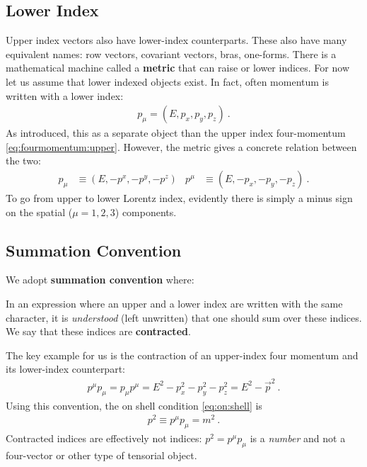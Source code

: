 \documentclass[12pt, oneside]{report}    %
\begin{document}
\subsection{Lower Index}\label{sec:index:lower}

Upper index vectors also have lower-index counterparts. These also have many equivalent names: row vectors, covariant vectors, bras, one-forms. There is a mathematical machine called a \textbf{metric} that can raise or lower indices. For now let us assume that lower indexed objects exist. In fact, often momentum is written with a lower index:
\begin{align}
    p_\mu = (E, p_x, p_y, p_z) \ . 
    \label{eq:fourmomentum:lower}
\end{align}
As introduced, this as a separate object than the upper index four-momentum \eqref{eq:fourmomentum:upper}. However, the metric gives a concrete relation between the two:
\begin{align}
    p_\mu &\equiv (E, -p^x, -p^y, -p^z)
    &
    p^\mu &\equiv (E, -p_x, -p_y, -p_z) \ .
\end{align}
To go from upper to lower Lorentz index, evidently there is simply a minus sign on the spatial ($\mu=1,2,3$) components. 






\subsection{Summation Convention}

We adopt \textbf{summation convention} where:
\begin{newrule}
In an expression where an upper and a lower index are written with the same character, it is \emph{understood} (left unwritten) that one should sum over these indices. We say that these indices are \textbf{contracted}.
\end{newrule}
The key example for us is the contraction of an upper-index four momentum and its lower-index counterpart:
\begin{align}
    p^\mu p_\mu = p_\mu p^\mu = E^2 - p_x^2 - p_y^2 - p_z^2 = E^2 - \vec{p}^2 \ .
\end{align}
Using this convention, the on shell condition \eqref{eq:on:shell} is
\begin{align}
    p^2 \equiv p^\mu p_\mu = m^2 \ .
\end{align}
Contracted indices are effectively not indices: $p^2 = p^\mu p_\mu$ is a \emph{number} and not a four-vector or other type of tensorial object. 
\end{document}
